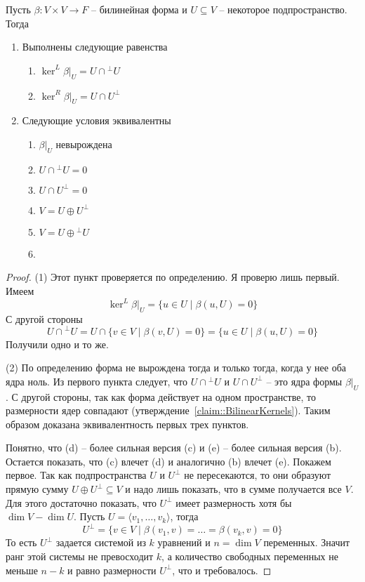 \begin{claim}
\label{claim::NonDegRestrictionBil}
Пусть $\beta\colon V\times V\to F$ -- билинейная форма и $U\subseteq V$ -- некоторое подпространство.
Тогда
\begin{enumerate}
\item Выполнены следующие равенства
\begin{enumerate}
\item $\ker^L \beta|_U = U\cap {}^\bot U$

\item $\ker^R \beta|_U = U \cap U^\bot$
\end{enumerate}

\item Следующие условия эквивалентны
\begin{multicols}{2}
\begin{enumerate}
\item $\beta|_U$ невырождена

\item $U\cap {}^\bot U = 0$

\item $U \cap U^\bot = 0$

\item $V = U\oplus U^\bot$

\item $V = U\oplus{}^\bot U$

\item[\vspace{\fill}]
\end{enumerate}
\end{multicols}
\end{enumerate}
\end{claim}
\begin{proof}
(1) Этот пункт проверяется по определению.
Я проверю лишь первый.
Имеем
\[
\ker^L \beta|_U = \{u \in U\mid \beta(u, U) = 0\}
\]
С другой стороны
\[
U \cap {}^\bot U = U \cap \{v\in V\mid \beta(v, U) = 0\} = \{u\in U\mid \beta(u, U) = 0\}
\]
Получили одно и то же.

(2) По определению форма не вырождена тогда и только тогда, когда у нее оба ядра ноль.
Из первого пункта следует, что $U\cap {}^\bot U$ и $U\cap U^\bot$ -- это ядра формы $\beta|_U$.
С другой стороны, так как форма действует на одном пространстве, то размерности ядер совпадают (утверждение~\ref{claim::BilinearKernels}).
Таким образом доказана эквивалентность первых трех пунктов.

Понятно, что (d) -- более сильная версия (c) и (e) -- более сильная версия (b).
Остается показать, что (c) влечет (d) и аналогично (b) влечет (e).
Покажем первое.
Так как подпространства $U$ и $U^\bot$ не пересекаются, то они образуют прямую сумму $U\oplus U^\bot \subseteq V$ и надо лишь показать, что в сумме получается все $V$.
Для этого достаточно показать, что $U^\bot$ имеет размерность хотя бы $\dim V - \dim U$.
Пусть $U = \langle v_1,\ldots, v_k\rangle$, тогда 
\[
U^\bot = \{v\in V \mid \beta(v_1, v) = \ldots = \beta(v_k, v) = 0\}
\]
То есть $U^\bot$ задается системой из $k$ уравнений и $n = \dim V$ переменных.
Значит ранг этой системы не превосходит $k$, а количество свободных переменных не меньше $n - k$ и равно размерности $U^\bot$, что и требовалось.
\end{proof}

